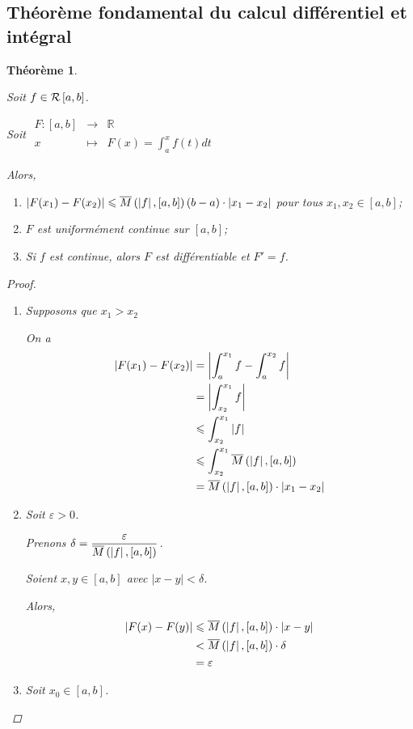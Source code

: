 \documentclass{report}
\newcommand*{\dint}[3]{\displaystyle\int_{#1}^{#2}#3}
\newcommand*{\abs}[1]{\left| #1 \right|}
\newcommand*{\eps}{\varepsilon}
\newcommand*{\lte}{\leqslant}
\newcommand*{\reels}{\mathbb{R}}
\newtheorem*{thm}{Th\'eor\`eme}
\theoremstyle{definition}
\theoremstyle{remark}
\begin{document}
	\subsection{Th\'eor\`eme fondamental du calcul diff\'erentiel et int\'egral}
	\begin{thm}
		~

		Soit $f \in \riemann$.

		Soit
		$\begin{array}{rcl}
			F:[a,b]&\to&\reels\\
			x&\mapsto&F(x) = \displaystyle\int_{a}^{x}f(t) dt
		\end{array}$

		Alors,
		\begin{enumerate}[label=\alph*)]
			\item $\abs{F(x_1)-F(x_2)} \lte \msup{\abs{f}}(b-a) \cdot \abs{x_1-x_2}$ pour tous $x_1,x_2 \in [a,b]$;
			\item $F$ est uniform\'ement continue sur $[a,b]$;
			\item Si $f$ est continue, alors $F$ est diff\'erentiable et $F'=f$.
		\end{enumerate}
		\begin{proof}~

			\begin{enumerate}[label=\alph*)]
				\item Supposons que $x_1>x_2$

				On a
				\begin{align*}
					\abs{F(x_1)-F(x_2)}&= \abs{\dint{a}{x_1}{f} - \dint{a}{x_2}{f}}\\
					&= \abs{\dint{x_2}{x_1}{f}}\\
					&\lte \dint{x_2}{x_1}{\abs{f}}\\
					&\lte \dint{x_2}{x_1}{\msup{\abs{f}}}\\
					&= \msup{\abs{f}} \cdot \abs{x_1-x_2}
				\end{align*}
				\item Soit $\eps>0$.

				Prenons $\delta = \dfrac{\eps}{\msup{\abs{f}}}$.

				Soient $x,y \in [a,b]$ avec $\abs{x-y}<\delta$.

				Alors,
				\begin{align*}
					\abs{F(x)-F(y)}&\lte \msup{\abs{f}} \cdot \abs{x-y}\\
					&< \msup{\abs{f}} \cdot \delta\\
					&= \eps
				\end{align*}
				\item Soit $x_0 \in [a,b]$.


\end{enumerate}
\end{proof}
\end{thm}
\end{document}

